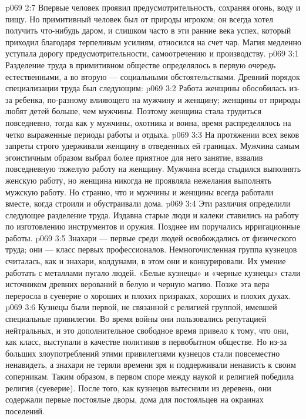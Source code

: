 \vs p069 2:7 Впервые человек проявил предусмотрительность, сохраняя огонь, воду и пищу. Но примитивный человек был от природы игроком; он всегда хотел получить что\hyp{}нибудь даром, и слишком часто в эти ранние века успех, который приходил благодаря терпеливым усилиям, относился на счет чар. Магия медленно уступала дорогу предусмотрительности, самоотречению и производству.
\vs p069 3:1 Разделение труда в примитивном обществе определялось в первую очередь естественными, а во вторую --- социальными обстоятельствами. Древний порядок специализации труда был следующим:
\vs p069 3:2 \bibnobreakspace {} Работа женщины обособилась из\hyp{}за ребенка, по\hyp{}разному влияющего на мужчину и женщину; женщины от природы любят детей больше, чем мужчины. Поэтому женщина стала трудиться повседневно, тогда как у мужчины, охотника и воина, время распределялось на четко выраженные периоды работы и отдыха.
\vs p069 3:3 \pc На протяжении всех веков запреты строго удерживали женщину в отведенных ей границах. Мужчина самым эгоистичным образом выбрал более приятное для него занятие, взвалив повседневную тяжелую работу на женщину. Мужчина всегда стыдился выполнять женскую работу, но женщина никогда не проявляла нежелания выполнять мужскую работу. Но странно, что и мужчины и женщины всегда работали вместе, когда строили и обустраивали дома.
\vs p069 3:4 \pc {}\bibnobreakspace {} Эти различия определили следующее разделение труда. Издавна старые люди и калеки ставились на работу по изготовлению инструментов и оружия. Позднее им поручались ирригационные работы.
\vs p069 3:5 \pc {}\bibnobreakspace {} Знахари --- первые среди людей освобождались от физического труда; они --- класс первых профессионалов. Немногочисленная группа кузнецов считалась, как и знахари, колдунами, в этом они и конкурировали. Их умение работать с металлами пугало людей. «Белые кузнецы» и «черные кузнецы» стали источником древних верований в белую и черную магию. Позже эта вера переросла в суеверие о хороших и плохих призраках, хороших и плохих духах.
\vs p069 3:6 Кузнецы были первой, не связанной с религией группой, имевшей специальные привилегии. Во время войны они пользовались репутацией нейтральных, и это дополнительное свободное время привело к тому, что они, как класс, выступали в качестве политиков в первобытном обществе. Но из\hyp{}за больших злоупотреблений этими привилегиями кузнецов стали повсеместно ненавидеть, а знахари не теряли времени зря и поддерживали ненависть к своим соперникам. Таким образом, в первом споре между наукой и религией победила религия (суеверие). После того, как кузнецов вытеснили из деревень, они содержали первые постоялые дворы, дома для постояльцев на окраинах поселений.
